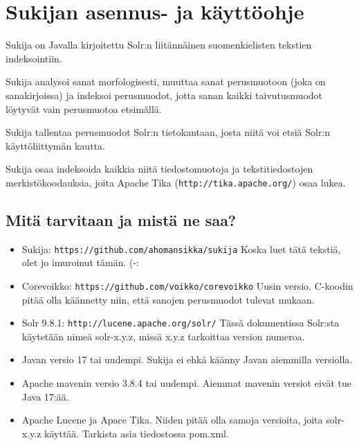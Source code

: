 \documentclass[12pt]{article}
\begin{document}
\pagestyle{fancy}
\setlength{\parindent}{0pt}
\setlength{\parskip}{1ex plus 0.5ex minus 0.2ex}
\section*{Sukijan asennus- ja käyttöohje}


Sukija on Javalla kirjoitettu Solr:n liitännäinen suomenkielisten
tekstien indeksointiin.

Sukija analysoi sanat morfologisesti, muuttaa sanat perusmuotoon (joka
on sanakirjoissa) ja indeksoi perusmuodot, jotta sanan kaikki
taivutusmuodot löytyvät vain perusmuotoa etsimällä.

Sukija tallentaa perusmuodot Solr:n tietokantaan, josta niitä voi
etsiä Solr:n käyttöliittymän kautta.

Sukija osaa indeksoida kaikkia niitä tiedostomuotoja ja
tekstitiedostojen merkistökoodauksia, joita Apache Tika
(\verb=http://tika.apache.org/=) osaa lukea.


\subsection*{Mitä tarvitaan ja mistä ne saa?}

\begin{itemize}
\item Sukija:
      \verb=https://github.com/ahomansikka/sukija=
      Koska luet tätä tekstiä, olet jo imuroinut tämän. (-:

\item Corevoikko:
      \verb=https://github.com/voikko/corevoikko=
      Uusin versio. C-koodin pitää olla käännetty niin,
      että sanojen perusmuodot tulevat mukaan.

\item Solr 9.8.1:
      \verb=http://lucene.apache.org/solr/=
      Tässä dokumentissa Solr:sta käytetään nimeä solr-x.y.z,
      missä x.y.z tarkoittaa version numeroa.

\item Javan versio 17 tai uudempi. Sukija ei ehkä käänny Javan aiemmilla versiolla.

\item Apache mavenin versio 3.8.4 tai uudempi.
      Aiemmat mavenin versiot eivät tue Java 17:ää.

\item Apache Lucene ja Apace Tika. Niiden pitää olla samoja versioita,
      joita solr-x.y.z käyttää. Tarkista asia tiedostossa pom.xml.
\end{itemize}
\end{document}
